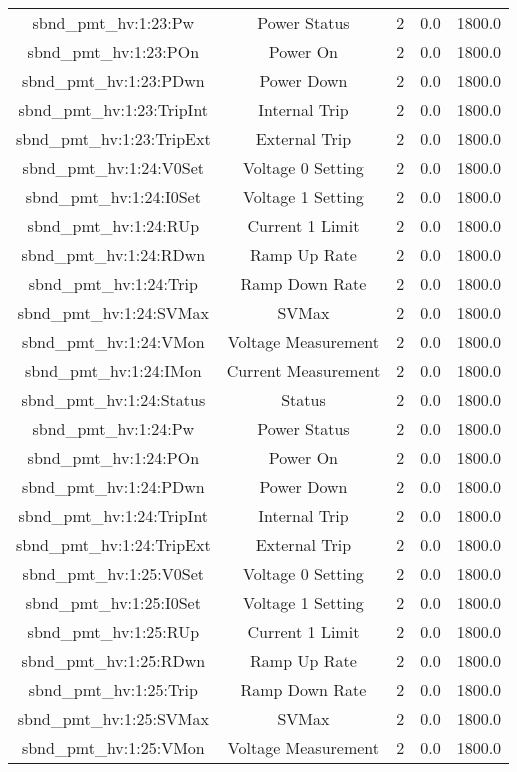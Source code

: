 \begin{table}[ptb]
\begin{tabular}{c | c c c c}
sbnd_pmt_hv:1:23:Pw & Power Status & 2 & 0.0 & 1800.0\\ 
sbnd_pmt_hv:1:23:POn & Power On & 2 & 0.0 & 1800.0\\ 
sbnd_pmt_hv:1:23:PDwn & Power Down & 2 & 0.0 & 1800.0\\ 
sbnd_pmt_hv:1:23:TripInt & Internal Trip & 2 & 0.0 & 1800.0\\ 
sbnd_pmt_hv:1:23:TripExt & External Trip & 2 & 0.0 & 1800.0\\ 
sbnd_pmt_hv:1:24:V0Set & Voltage 0 Setting & 2 & 0.0 & 1800.0\\ 
sbnd_pmt_hv:1:24:I0Set & Voltage 1 Setting & 2 & 0.0 & 1800.0\\ 
sbnd_pmt_hv:1:24:RUp & Current 1 Limit & 2 & 0.0 & 1800.0\\ 
sbnd_pmt_hv:1:24:RDwn & Ramp Up Rate & 2 & 0.0 & 1800.0\\ 
sbnd_pmt_hv:1:24:Trip & Ramp Down Rate & 2 & 0.0 & 1800.0\\ 
sbnd_pmt_hv:1:24:SVMax & SVMax & 2 & 0.0 & 1800.0\\ 
sbnd_pmt_hv:1:24:VMon & Voltage Measurement & 2 & 0.0 & 1800.0\\ 
sbnd_pmt_hv:1:24:IMon & Current Measurement & 2 & 0.0 & 1800.0\\ 
sbnd_pmt_hv:1:24:Status & Status & 2 & 0.0 & 1800.0\\ 
sbnd_pmt_hv:1:24:Pw & Power Status & 2 & 0.0 & 1800.0\\ 
sbnd_pmt_hv:1:24:POn & Power On & 2 & 0.0 & 1800.0\\ 
sbnd_pmt_hv:1:24:PDwn & Power Down & 2 & 0.0 & 1800.0\\ 
sbnd_pmt_hv:1:24:TripInt & Internal Trip & 2 & 0.0 & 1800.0\\ 
sbnd_pmt_hv:1:24:TripExt & External Trip & 2 & 0.0 & 1800.0\\ 
sbnd_pmt_hv:1:25:V0Set & Voltage 0 Setting & 2 & 0.0 & 1800.0\\ 
sbnd_pmt_hv:1:25:I0Set & Voltage 1 Setting & 2 & 0.0 & 1800.0\\ 
sbnd_pmt_hv:1:25:RUp & Current 1 Limit & 2 & 0.0 & 1800.0\\ 
sbnd_pmt_hv:1:25:RDwn & Ramp Up Rate & 2 & 0.0 & 1800.0\\ 
sbnd_pmt_hv:1:25:Trip & Ramp Down Rate & 2 & 0.0 & 1800.0\\ 
sbnd_pmt_hv:1:25:SVMax & SVMax & 2 & 0.0 & 1800.0\\ 
sbnd_pmt_hv:1:25:VMon & Voltage Measurement & 2 & 0.0 & 1800.0\\ 

\end{tabular}
\end{table}
